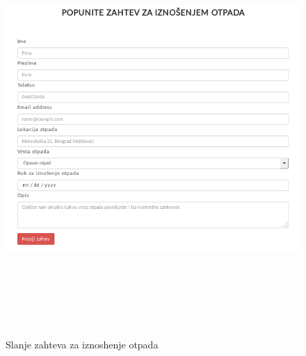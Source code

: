 \documentclass[10 pt]{article}
\begin{document}
		\begin{figure}[H]
			\centering
			\includegraphics[width=15cm,height=15cm,keepaspectratio]{GUI/formularZaSlanjeZahteva.png}\\
			\caption{Slanje zahteva za iznoshenje otpada}
			\label{fig:zahtevFormular}
		\end{figure}
	
\end{document}
